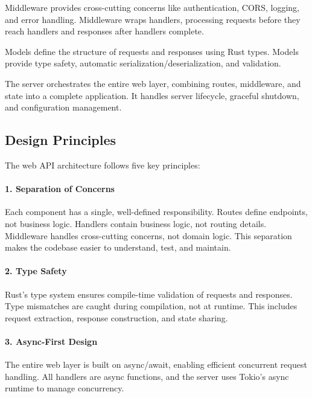 \begin{infobox}[Middleware]
Middleware provides cross-cutting concerns like authentication, CORS, logging, and error handling. Middleware wraps handlers, processing requests before they reach handlers and responses after handlers complete.
\end{infobox}

\begin{infobox}[Models]
Models define the structure of requests and responses using Rust types. Models provide type safety, automatic serialization/deserialization, and validation.
\end{infobox}

\begin{infobox}[Server]
The server orchestrates the entire web layer, combining routes, middleware, and state into a complete application. It handles server lifecycle, graceful shutdown, and configuration management.
\end{infobox}

\subsection{Design Principles}

The web API architecture follows five key principles:

\paragraph{1. Separation of Concerns}
Each component has a single, well-defined responsibility. Routes define endpoints, not business logic. Handlers contain business logic, not routing details. Middleware handles cross-cutting concerns, not domain logic. This separation makes the codebase easier to understand, test, and maintain.

\paragraph{2. Type Safety}
Rust's type system ensures compile-time validation of requests and responses. Type mismatches are caught during compilation, not at runtime. This includes request extraction, response construction, and state sharing.

\paragraph{3. Async-First Design}
The entire web layer is built on async/await, enabling efficient concurrent request handling. All handlers are async functions, and the server uses Tokio's async runtime to manage concurrency.

